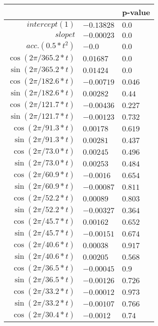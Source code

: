 \begin{tabular}{r|ll}
\hline
                        & \hat{\beta}   & p-value   \\
\hline
 $intercept (1)$        & $-0.13828$    & $0.0$     \\
 $slope t$              & $-0.00023$    & $0.0$     \\
 $acc. (0.5 * t^2)$     & $-0.0$        & $0.0$     \\
 $\cos(2\pi/365.2 * t)$ & $0.01687$     & $0.0$     \\
 $\sin(2\pi/365.2 * t)$ & $0.01424$     & $0.0$     \\
 $\cos(2\pi/182.6 * t)$ & $-0.00719$    & $0.046$   \\
 $\sin(2\pi/182.6 * t)$ & $0.00282$     & $0.44$    \\
 $\cos(2\pi/121.7 * t)$ & $-0.00436$    & $0.227$   \\
 $\sin(2\pi/121.7 * t)$ & $-0.00123$    & $0.732$   \\
 $\cos(2\pi/91.3 * t)$  & $0.00178$     & $0.619$   \\
 $\sin(2\pi/91.3 * t)$  & $0.00281$     & $0.437$   \\
 $\cos(2\pi/73.0 * t)$  & $0.00245$     & $0.496$   \\
 $\sin(2\pi/73.0 * t)$  & $0.00253$     & $0.484$   \\
 $\cos(2\pi/60.9 * t)$  & $-0.0016$     & $0.654$   \\
 $\sin(2\pi/60.9 * t)$  & $-0.00087$    & $0.811$   \\
 $\cos(2\pi/52.2 * t)$  & $0.00089$     & $0.803$   \\
 $\sin(2\pi/52.2 * t)$  & $-0.00327$    & $0.364$   \\
 $\cos(2\pi/45.7 * t)$  & $0.00162$     & $0.652$   \\
 $\sin(2\pi/45.7 * t)$  & $-0.00151$    & $0.674$   \\
 $\cos(2\pi/40.6 * t)$  & $0.00038$     & $0.917$   \\
 $\sin(2\pi/40.6 * t)$  & $0.00205$     & $0.568$   \\
 $\cos(2\pi/36.5 * t)$  & $-0.00045$    & $0.9$     \\
 $\sin(2\pi/36.5 * t)$  & $-0.00126$    & $0.726$   \\
 $\cos(2\pi/33.2 * t)$  & $-0.00012$    & $0.973$   \\
 $\sin(2\pi/33.2 * t)$  & $-0.00107$    & $0.766$   \\
 $\cos(2\pi/30.4 * t)$  & $-0.0012$     & $0.74$    \\

\end{tabular}
